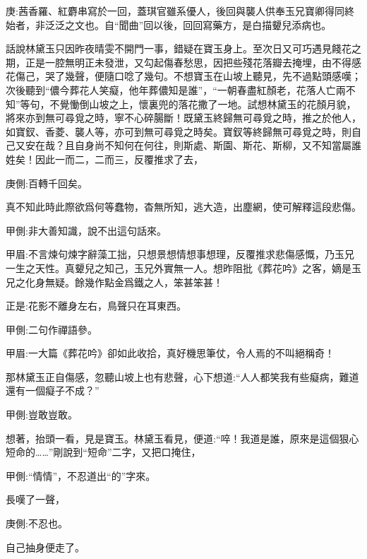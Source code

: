 

\begin{parag}
    \begin{note}庚:茜香羅、紅麝串寫於一回，蓋琪官雖系優人，後回與襲人供奉玉兄寶卿得同終始者，非泛泛之文也。自“聞曲”回以後，回回寫藥方，是白描顰兒添病也。\end{note}
\end{parag}


\begin{parag}
    話說林黛玉只因昨夜晴雯不開門一事，錯疑在寶玉身上。至次日又可巧遇見餞花之期，正是一腔無明正未發泄，又勾起傷春愁思，因把些殘花落瓣去掩埋，由不得感花傷己，哭了幾聲，便隨口唸了幾句。不想寶玉在山坡上聽見，先不過點頭感嘆；次後聽到“儂今葬花人笑癡，他年葬儂知是誰”，“一朝春盡紅顏老，花落人亡兩不知”等句，不覺慟倒山坡之上，懷裏兜的落花撒了一地。試想林黛玉的花顏月貌，將來亦到無可尋覓之時，寧不心碎腸斷！既黛玉終歸無可尋覓之時，推之於他人，如寶釵、香菱、襲人等，亦可到無可尋覓之時矣。寶釵等終歸無可尋覓之時，則自己又安在哉？且自身尚不知何在何往，則斯處、斯園、斯花、斯柳，又不知當屬誰姓矣！因此一而二，二而三，反覆推求了去，\begin{note}庚側:百轉千回矣。\end{note}真不知此時此際欲爲何等蠢物，杳無所知，逃大造，出塵網，使可解釋這段悲傷。\begin{note}甲側:非大善知識，說不出這句話來。\end{note}\begin{note}甲眉:不言煉句煉字辭藻工拙，只想景想情想事想理，反覆推求悲傷感慨，乃玉兄一生之天性。真顰兒之知己，玉兄外實無一人。想昨阻批《葬花吟》之客，嫡是玉兄之化身無疑。餘幾作點金爲鐵之人，笨甚笨甚！\end{note}正是:花影不離身左右，鳥聲只在耳東西。\begin{note}甲側:二句作禪語參。\end{note}\begin{note}甲眉:一大篇《葬花吟》卻如此收拾，真好機思筆仗，令人焉的不叫絕稱奇！\end{note}
\end{parag}


\begin{parag}
    那林黛玉正自傷感，忽聽山坡上也有悲聲，心下想道:“人人都笑我有些癡病，難道還有一個癡子不成？”\begin{note}甲側:豈敢豈敢。\end{note}想著，抬頭一看，見是寶玉。林黛玉看見，便道:“啐！我道是誰，原來是這個狠心短命的……”剛說到“短命”二字，又把口掩住，\begin{note}甲側:“情情”，不忍道出“的”字來。\end{note}長嘆了一聲，\begin{note}庚側:不忍也。\end{note}自己抽身便走了。
\end{parag}


